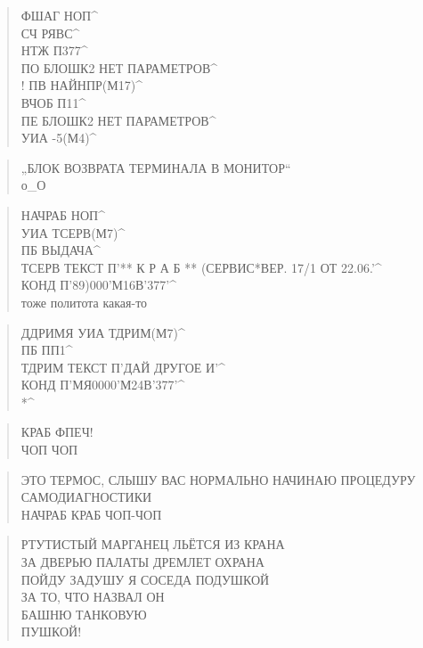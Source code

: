 \poemtitle{***}
\begin{verse}
ФШАГ НОП^\\
СЧ РЯВС^\\
НТЖ П377^\\
ПО БЛОШК2  НЕТ ПАРАМЕТРОВ^\\!
ПВ НАЙНПР(М17)^\\
ВЧОБ П11^\\
ПЕ БЛОШК2 НЕТ ПАРАМЕТРОВ^\\
УИА -5(М4)^
\end{verse}

\poemtitle{***}
\begin{verse}
„БЛОК ВОЗВРАТА ТЕРМИНАЛА В МОНИТОР“\\
о\_О
\end{verse}

\poemtitle{***}
\begin{verse}
НАЧРАБ НОП^\\
 УИА ТСЕРВ(М7)^\\
 ПБ ВЫДАЧА^\\
ТСЕРВ ТЕКСТ П'** К Р А Б ** (СЕРВИС*ВЕР. 17/1  ОТ 22.06.'^\\
 КОНД П'89)000'М16В'377'^\\
тоже политота какая-то
\end{verse}

\poemtitle{***}
\begin{verse}
ДДРИМЯ УИА ТДРИМ(М7)^\\
 ПБ ПП1^\\
ТДРИМ ТЕКСТ П'ДАЙ ДРУГОЕ И'^\\
 КОНД П'МЯ0000'М24В'377'^\\
*^
\end{verse}

\poemtitle{***}
\begin{verse}
КРАБ ФПЕЧ!\\
ЧОП ЧОП
\end{verse}

\poemtitle{***}
\begin{verse}
ЭТО ТЕРМОС, СЛЫШУ ВАС НОРМАЛЬНО НАЧИНАЮ ПРОЦЕДУРУ САМОДИАГНОСТИКИ\\
НАЧРАБ КРАБ ЧОП-ЧОП
\end{verse}

\poemtitle{***}
\begin{verse}
РТУТИСТЫЙ МАРГАНЕЦ ЛЬЁТСЯ ИЗ КРАНА\\
ЗА ДВЕРЬЮ ПАЛАТЫ ДРЕМЛЕТ ОХРАНА\\
ПОЙДУ ЗАДУШУ Я СОСЕДА ПОДУШКОЙ\\
ЗА ТО, ЧТО НАЗВАЛ ОН\\
              БАШНЮ ТАНКОВУЮ\\
                             ПУШКОЙ!
\end{verse}

